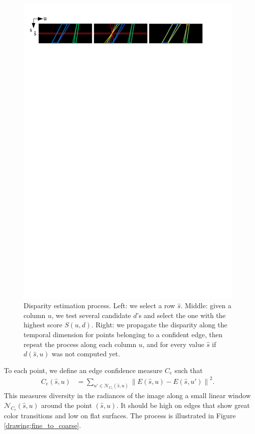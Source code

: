\documentclass{article}
\newcommand{\norm}[1]{\left\lVert#1\right\rVert}
\theoremstyle{definition}
\begin{document}
\begin{figure}[ht]
\centering
 \includegraphics[width=1.0\textwidth, trim=0.5cm 26cm 2.5cm 1cm, clip]{drawings/depth_estimation.pdf}
 \caption{Disparity estimation process. Left: we select a row $\widehat{s}$. Middle: given a column $u$, we test several candidate $d$'s and select the one with the highest score $S(u, d)$. Right: we propagate the disparity along the temporal dimension for points belonging to  a confident edge, then repeat the process along each column $u$, and for every value $\widehat{s}$ if $d(\widehat{s}, u)$ was not computed yet.}
 \label{drawing:depth_estimation}
\end{figure}



To each point, we define an edge confidence measure $C_e$ such that
\begin{align}
 C_e (\widehat{s}, u) &= \sum_{u' \in \mathcal{N}_{C_e}(\widehat{s}, u)} \norm{E(\widehat{s}, u) - E(\widehat{s}, u')}^2. 
\end{align}
This measures diversity in the radiances of the image along a small linear window $\mathcal{N}_{C_e}(\widehat{s}, u)$ around the point $(\widehat{s}, u)$. It should be high on edges that show great color transitions and low on flat surfaces. The process is illustrated in Figure \ref{drawing:fine_to_coarse}.
\end{document}
